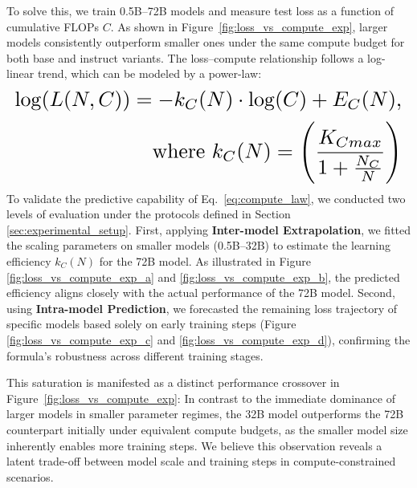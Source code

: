 To solve this, we train 0.5B–72B models and measure test loss as a function of cumulative FLOPs $C$. As shown in Figure~\ref{fig:loss_vs_compute_exp}, larger models consistently outperform smaller ones under the same compute budget for both base and instruct variants.  The loss–compute relationship follows a log-linear trend, which can be modeled by a power-law:
\begin{equation}
\label{eq:compute_law}
\resizebox{\columnwidth}{!}{$
\begin{aligned}
    \log(L(N,C)) = -k_C(N) \cdot \log(C) + E_{C}(N), \\
    \ \text{where} \  k_C(N) = \left(\frac{K_{Cmax}}{1+\frac{N_{C}}{N}}\right)
\end{aligned}
$}
\end{equation}
To validate the predictive capability of Eq.~\ref{eq:compute_law}, we conducted two levels of evaluation under the protocols defined in Section \ref{sec:experimental_setup}. First, applying \textbf{Inter-model Extrapolation}, we fitted the scaling parameters on smaller models (0.5B–32B) to estimate the learning efficiency $k_C(N)$ for the 72B model. As illustrated in Figure \ref{fig:loss_vs_compute_exp_a} and \ref{fig:loss_vs_compute_exp_b}, the predicted efficiency aligns closely with the actual performance of the 72B model. Second, using \textbf{Intra-model Prediction}, we forecasted the remaining loss trajectory of specific models based solely on early training steps (Figure \ref{fig:loss_vs_compute_exp_c} and \ref{fig:loss_vs_compute_exp_d}), confirming the formula's robustness across different training stages.


This saturation is manifested as a distinct performance crossover in Figure~\ref{fig:loss_vs_compute_exp}: In contrast to the immediate dominance of larger models in smaller parameter regimes, the 32B model outperforms the 72B counterpart initially under equivalent compute budgets, as the smaller model size inherently enables more training steps. We believe this observation reveals a latent trade-off between model scale and training steps in compute-constrained scenarios.




